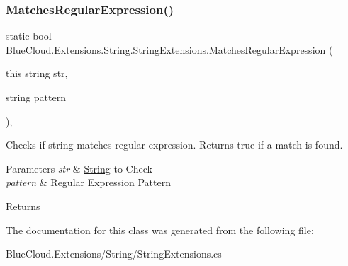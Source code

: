 \subsubsection{\texorpdfstring{Matches\+Regular\+Expression()}{MatchesRegularExpression()}}
{\footnotesize\ttfamily static bool Blue\+Cloud.\+Extensions.\+String.\+String\+Extensions.\+Matches\+Regular\+Expression (\begin{DoxyParamCaption}\item[{this string}]{str,  }\item[{string}]{pattern }\end{DoxyParamCaption})\hspace{0.3cm}{\ttfamily [inline]}, {\ttfamily [static]}}



Checks if string matches regular expression. Returns true if a match is found. 


\begin{DoxyParams}{Parameters}
{\em str} & \mbox{\hyperlink{namespace_blue_cloud_1_1_extensions_1_1_string}{String}} to Check\\
\hline
{\em pattern} & Regular Expression Pattern\\
\hline
\end{DoxyParams}
\begin{DoxyReturn}{Returns}

\end{DoxyReturn}


The documentation for this class was generated from the following file\+:\begin{DoxyCompactItemize}
\item 
Blue\+Cloud.\+Extensions/\+String/String\+Extensions.\+cs\end{DoxyCompactItemize}
